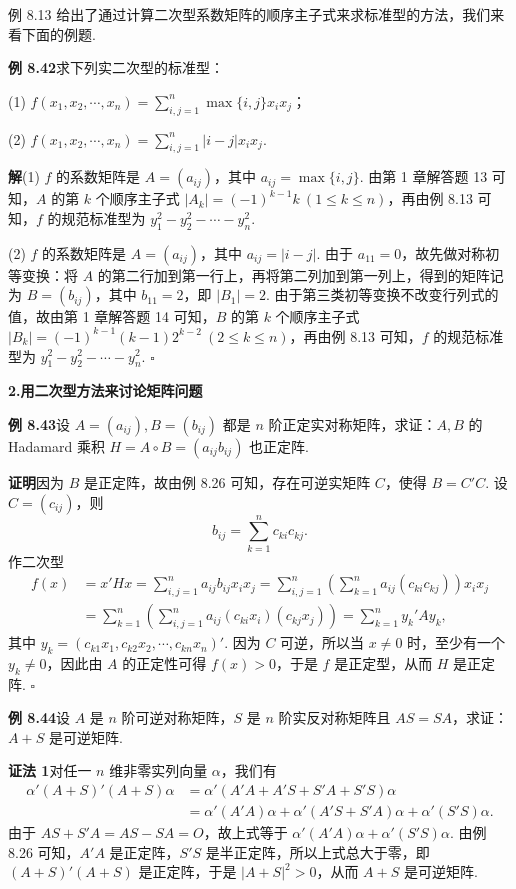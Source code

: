 \documentclass[UTF8, 12pt, fontset=fandol, oneside]{ctexart}
\begin{document}
例 8.13 给出了通过计算二次型系数矩阵的顺序主子式来求标准型的方法，我们来看下面的例题.

\noindent\textbf{例 8.42}\quad 求下列实二次型的标准型：

(1) $f(x_1,x_2,\cdots,x_n)=\displaystyle\sum_{i,j=1}^n \max\{i,j\}x_ix_j$；

(2) $f(x_1,x_2,\cdots,x_n)=\displaystyle\sum_{i,j=1}^n |i-j|x_ix_j$.

\noindent\textbf{解}\quad (1) $f$ 的系数矩阵是 $A=(a_{ij})$，其中 $a_{ij}=\max\{i,j\}$. 由第 1 章解答题 13 可知，$A$ 的第 $k$ 个顺序主子式 $|A_k|=(-1)^{k-1}k\ (1\le k\le n)$，再由例 8.13 可知，$f$ 的规范标准型为 $y_1^2-y_2^2-\cdots-y_n^2$.

(2) $f$ 的系数矩阵是 $A=(a_{ij})$，其中 $a_{ij}=|i-j|$. 由于 $a_{11}=0$，故先做对称初等变换：将 $A$ 的第二行加到第一行上，再将第二列加到第一列上，得到的矩阵记为 $B=(b_{ij})$，其中 $b_{11}=2$，即 $|B_1|=2$. 由于第三类初等变换不改变行列式的值，故由第 1 章解答题 14 可知，$B$ 的第 $k$ 个顺序主子式 $|B_k|=(-1)^{k-1}(k-1)2^{k-2}\ (2\le k\le n)$，再由例 8.13 可知，$f$ 的规范标准型为 $y_1^2-y_2^2-\cdots-y_n^2$. $\ensuremath{\square}$

\noindent\textbf{2.\quad 用二次型方法来讨论矩阵问题}

\noindent\textbf{例 8.43}\quad 设 $A=(a_{ij}),B=(b_{ij})$ 都是 $n$ 阶正定实对称矩阵，求证：$A,B$ 的 Hadamard 乘积 $H=A\circ B=(a_{ij}b_{ij})$ 也正定阵.

\noindent\textbf{证明}\quad 因为 $B$ 是正定阵，故由例 8.26 可知，存在可逆实矩阵 $C$，使得 $B=C'C$. 设 $C=(c_{ij})$，则
\[
b_{ij}=\sum_{k=1}^n c_{ki}c_{kj}.
\]
作二次型
\[
\begin{aligned}
f(x)&=x'Hx=\sum_{i,j=1}^n a_{ij}b_{ij}x_ix_j
=\sum_{i,j=1}^n\left(\sum_{k=1}^n a_{ij}(c_{ki}c_{kj})\right)x_ix_j\\
&=\sum_{k=1}^n\left(\sum_{i,j=1}^n a_{ij}(c_{ki}x_i)(c_{kj}x_j)\right)
=\sum_{k=1}^n y_k'Ay_k,
\end{aligned}
\]
其中 $y_k=(c_{k1}x_1,c_{k2}x_2,\cdots,c_{kn}x_n)'$. 因为 $C$ 可逆，所以当 $x\ne 0$ 时，至少有一个 $y_k\ne 0$，因此由 $A$ 的正定性可得 $f(x)>0$，于是 $f$ 是正定型，从而 $H$ 是正定阵. $\ensuremath{\square}$

\noindent\textbf{例 8.44}\quad 设 $A$ 是 $n$ 阶可逆对称矩阵，$S$ 是 $n$ 阶实反对称矩阵且 $AS=SA$，求证：$A+S$ 是可逆矩阵.

\noindent\textbf{证法 1}\quad 对任一 $n$ 维非零实列向量 $\alpha$，我们有
\[
\begin{aligned}
\alpha'(A+S)'(A+S)\alpha
&=\alpha'(A'A+A'S+S'A+S'S)\alpha\\
&=\alpha'(A'A)\alpha+\alpha'(A'S+S'A)\alpha+\alpha'(S'S)\alpha.
\end{aligned}
\]
由于 $AS+S'A=AS-SA=O$，故上式等于 $\alpha'(A'A)\alpha+\alpha'(S'S)\alpha$. 由例 8.26 可知，$A'A$ 是正定阵，$S'S$ 是半正定阵，所以上式总大于零，即 $(A+S)'(A+S)$ 是正定阵，于是 $|A+S|^2>0$，从而 $A+S$ 是可逆矩阵.
\end{document}
